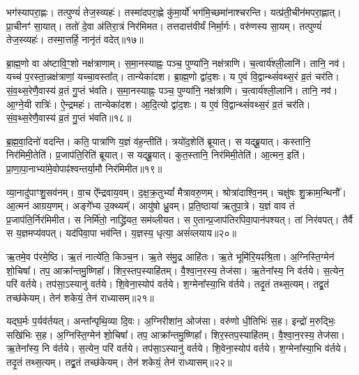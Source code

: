 भग॑स्यापरा॒ह्णः।
तत्पुण्यं॑ तेज॒स्व्यहः॑।
तस्मा॑दपरा॒ह्णे कु॑मा॒र्यो॑ भग॑मि॒च्छमा॑नाश्चरन्ति।
यत्प्र॑ती॒चीन॑मपरा॒ह्णात्।
प्रा॒चीनꣳ॑ सा॒यात्।
ततो॑ दे॒वा अ॑तिरा॒त्रं निर॑मिमत।
तत्तदात्त॑वीर्यं निर्मा॒र्गः।
वरु॑णस्य सा॒यम्।
तत्पुण्यं॑ तेज॒स्व्यहः॑।
तस्मा॒त्तर्\mbox{}हि॒ नानृ॑तं वदेत्॥१७॥\ip

ब्रा॒ह्म॒णो वा अ॑ष्टावि॒ꣳ॒शो नक्ष॑त्राणाम्।
स॒मा॒नस्याह्नः॒ पञ्च॒ पुण्या॑नि॒ नक्ष॑त्राणि।
च॒त्वार्य॑श्ली॒लानि॑।
तानि॒ नव॑।
यच्च॑ प॒रस्ता॒न्नक्ष॑त्राणां॒ यच्चा॒वस्ता᳚त्।
तान्येका॑दश।
ब्रा॒ह्म॒णो द्वा॑द॒शः।
य ए॒वं वि॒द्वान्थ्सं॑वथ्स॒रं व्र॒तं चर॑ति।
सं॒व॒थ्स॒रेणै॒वास्य॑ व्र॒तं गु॒प्तं भ॑वति।
स॒मा॒नस्याह्नः॒ पञ्च॒ पुण्या॑नि॒ नक्ष॑त्राणि।
च॒त्वार्य॑श्ली॒लानि॑।
तानि॒ नव॑।
आ॒ग्ने॒यी रात्रिः॑।
ऐ॒न्द्रमहः॑।
तान्येका॑दश।
आ॒दि॒त्यो द्वा॑द॒शः।
य ए॒वं वि॒द्वान्थ्सं॑वथ्स॒रं व्र॒तं चर॑ति।
सं॒व॒थ्स॒रेणै॒वास्य॑ व्र॒तं गु॒प्तं भ॑वति॥१८॥\ip\anuvakamend[स॒ङ्ग॒वाथ्षो॑ड॒शिनं॒ निर॑मिमत॒ तत्तदात्त॑वीर्यं निर्मा॒र्गो व॑देद्भवति समा॒नस्याह्नः॒ पञ्च॒ पुण्या॑नि॒ नक्ष॑त्राण्य॒ष्टौ च॑]

ब्र॒ह्म॒वा॒दिनो॑ वदन्ति।
कति॒ पात्रा॑णि य॒ज्ञं व॑ह॒न्तीति॑।
त्रयो॑द॒शेति॑ ब्रूयात्।
स यद्ब्रू॒यात्।
कस्तानि॒ निर॑मिमी॒तेति॑।
प्र॒जा\-प॑ति॒रिति॑ ब्रूयात्।
स यद्ब्रू॒यात्।
कुत॒स्तानि॒ निर॑मिमी॒तेति॑।
आ॒त्मन॒ इति॑।
प्रा॒णा॒पा॒नाभ्या॑मे॒वोपाꣴ॑\-श्वन्तर्या॒मौ निर॑मिमीत॥१९॥\ip

व्या॒नादु॑पाꣳशु॒सव॑नम्।
वा॒च ऐ᳚न्द्रवाय॒वम्।
द॒क्ष॒क्र॒तुभ्यां᳚ मैत्रावरु॒णम्।
श्रोत्रा॑दाश्वि॒नम्।
चक्षु॑षः शु॒क्राम॒न्थिनौ᳚।
आ॒त्मन॑ आग्रय॒णम्।
अङ्गे᳚भ्य उ॒क्थ्यम्᳚।
आयु॑षो ध्रु॒वम्।
प्र॒ति॒ष्ठाया॑ ऋतुपा॒त्रे।
य॒ज्ञं वाव तं प्र॒जा\-प॑ति॒र्निर॑मिमीत।
स निर्मि॑तो॒ नाद्ध्रि॑यत॒ सम॑व्लीयत।
स ए॒तान्प्र॒जा\-प॑तिरपिवा॒पान॑पश्यत्।
तां निर॑वपत्।
तैर्वै स य॒ज्ञमप्य॑वपत्।
यद॑पिवा॒पा भव॑न्ति।
य॒ज्ञस्य॒ धृत्या॒ असं॑व्लयाय॥२०॥\ip\anuvakamend[उ॒पा॒ꣳ॒श्व॒न्त॒र्या॒मौ निर॑मिमीतामिमीत॒ षट्च॑]

ऋ॒तमे॒व प॑रमे॒ष्ठि।
ऋ॒तं नात्ये॑ति॒ किञ्च॒न।
ऋ॒ते स॑मु॒द्र आहि॑तः।
ऋ॒ते भूमि॑रि॒यꣴश्रि॒ता।
अ॒ग्निस्ति॒ग्मेन॑ शो॒चिषा᳚।
तप॒ आक्रा᳚न्तमु॒ष्णिहा᳚।
शिर॒स्तप॒स्याहि॑तम्।
वै॒श्वा॒न॒रस्य॒ तेज॑सा।
ऋ॒तेना᳚स्य॒ नि व॑र्तये।
स॒त्येन॒ परि॑ वर्तये।
तप॑सा॒\-ऽस्यानु॑ वर्तये।
शि॒वेना॒स्योप॑ वर्तये।
श॒ग्मेना᳚स्या॒भि व॑र्तये।
तदृ॒तं तथ्स॒त्यम्।
तद्व्र॒तं तच्छ॑केयम्।
तेन॑ शकेयं॒ तेन॑ राध्यासम्॥२१॥\ip

यद्\mbox{}घ॒र्मः प॒र्यव॑र्तयत्।
अन्ता᳚न्पृथि॒व्या दि॒वः।
अ॒ग्निरीशा॑न॒ ओज॑सा।
वरु॑णो धी॒तिभिः॑ स॒ह।
इन्द्रो॑ म॒रुद्भिः॒ सखि॑भिः स॒ह।
अ॒ग्निस्ति॒ग्मेन॑ शो॒चिषा᳚।
तप॒ आक्रा᳚न्तमु॒ष्णिहा᳚।
शिर॒स्तप॒स्याहि॑तम्।
वै॒श्वा॒न॒रस्य॒ तेज॑सा।
ऋ॒तेना᳚स्य॒ नि व॑र्तये।
स॒त्येन॒ परि॑ वर्तये।
तप॑सा॒\-ऽस्यानु॑ वर्तये।
शि॒वेना॒स्योप॑ वर्तये।
श॒ग्मेना᳚स्या॒भि व॑र्तये।
तदृ॒तं तथ्स॒त्यम्।
तद्व्र॒तं तच्छ॑केयम्।
तेन॑ शकेयं॒ तेन॑ राध्यासम्॥२२॥\ip

